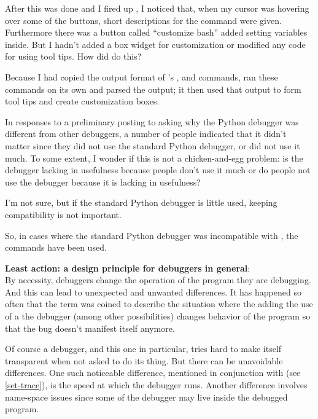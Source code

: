 After this was done and I fired up , I noticed that, when my
cursor was hovering over some of the buttons, short descriptions for
the command were given. Furthermore there was a button called
``customize bash'' added setting variables inside. But I hadn't added
a box widget for customization or modified any code for using tool
tips. How did  do this?

Because I had copied the output format of 's ,
 and  commands,  ran these commands on
its own and parsed the output; it then used that output to form tool
tips and create customization boxes.

In responses to a preliminary posting to 
asking why the Python debugger was different from other debuggers, a
number of people indicated that it didn't matter since they did not use
the standard Python debugger, or did not use it much.  To some extent,
I wonder if this is not a chicken-and-egg problem: is the debugger
lacking in usefulness because people don't use it much or do people
not use the debugger because it is lacking in usefulness?

I'm not sure, but if the standard Python debugger is little used,
keeping compatibility is not important.

So, in cases where the standard Python
debugger was incompatible with , the  commands
have been used.

{\bf Least action: a design principle for debuggers in general}:\\ By
necessity, debuggers change the operation of the program they are
debugging. And this can lead to unexpected and unwanted
differences. It has happened so often that the term
 was
coined to describe the situation where the adding the use of a the
debugger (among other possibilities) changes behavior of the program
so that the bug doesn't manifest itself anymore.

Of course a debugger, and this one in particular, tries hard to make
itself transparent when not asked to do its thing. But there can be
unavoidable differences. One such noticeable difference, mentioned in
conjunction with  (see \ref{set-trace}), is the
speed at which the debugger runs. Another difference involves
name-space issues since some of the debugger may live inside the
debugged program.

